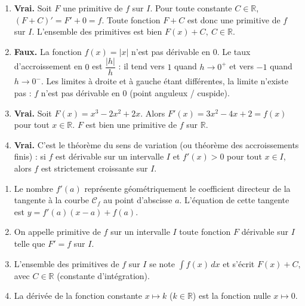 \documentclass[11pt]{article}
\newcommand{\cle}[1]{{\popxbold\color{popdark}#1}}
\begin{document}
\begin{corrige}
\begin{enumerate}
    \item \textbf{Vrai.} Soit $F$ une primitive de $f$ sur $I$. Pour toute constante $C\in\mathbb{R}$, $(F+C)' = F' + 0 = f$. Toute fonction $F+C$ est donc une primitive de $f$ sur $I$. L'ensemble des primitives est bien $F(x)+C,\ C\in\mathbb{R}$.
    \item \textbf{Faux.} La fonction $f(x)=|x|$ n'est pas dérivable en $0$. Le taux d'accroissement en $0$ est $\dfrac{|h|}{h}$ : il tend vers $1$ quand $h\to 0^+$ et vers $-1$ quand $h\to 0^-$. Les limites à droite et à gauche étant différentes, la limite n'existe pas : $f$ n'est pas dérivable en $0$ (point anguleux / cuspide).
    \item \textbf{Vrai.} Soit $F(x)=x^3-2x^2+2x$. Alors $F'(x)=3x^2-4x+2=f(x)$ pour tout $x\in\mathbb{R}$. $F$ est bien une primitive de $f$ sur $\mathbb{R}$.
    \item \textbf{Vrai.} C'est le théorème du sens de variation (ou théorème des accroissements finis) : si $f$ est dérivable sur un intervalle $I$ et $f'(x)>0$ pour tout $x\in I$, alors $f$ est strictement croissante sur $I$.
\end{enumerate}
\end{corrige}

\begin{corrige}
\begin{enumerate}
    \item Le nombre $f'(a)$ représente géométriquement le \cle{coefficient directeur} de la \cle{tangente} à la courbe $\mathcal{C}_f$ au point d'abscisse $a$. L'équation de cette tangente est $y = f'(a)(x-a) + f(a)$.
    \item On appelle \cle{primitive} de $f$ sur un intervalle $I$ toute fonction $F$ dérivable sur $I$ telle que $F'=f$ sur $I$.
    \item L'ensemble des primitives de $f$ sur $I$ se note $\displaystyle\int f(x)\,dx$ et s'écrit $F(x)+C$, avec $C\in\mathbb{R}$ (constante d'intégration).
    \item La dérivée de la fonction constante $x\mapsto k$ ($k\in\mathbb{R}$) est la fonction nulle $x\mapsto 0$.
\end{enumerate}
\end{corrige}
\end{document}
